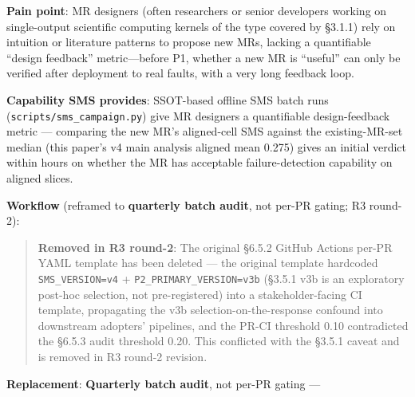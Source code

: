 \documentclass[review,12pt,authoryear]{elsarticle}
\begin{document}
\textbf{Pain point}: MR designers (often researchers or senior
developers working on single-output scientific computing kernels of the
type covered by §3.1.1) rely on intuition or literature patterns to
propose new MRs, lacking a quantifiable ``design feedback''
metric---before P1, whether a new MR is ``useful'' can only be verified
after deployment to real faults, with a very long feedback loop.

\textbf{Capability SMS provides}: SSOT-based offline SMS batch runs
(\texttt{scripts/sms\_campaign.py}) give MR designers a quantifiable
design-feedback metric --- comparing the new MR's aligned-cell SMS
against the existing-MR-set median (this paper's v4 main analysis
aligned mean 0.275) gives an initial verdict within hours on whether the
MR has acceptable failure-detection capability on aligned slices.

\textbf{Workflow} (reframed to \textbf{quarterly batch audit}, not
per-PR gating; R3 round-2):

\begin{quote}
\textbf{Removed in R3 round-2}: The original §6.5.2 GitHub Actions
per-PR YAML template has been deleted --- the original template
hardcoded \texttt{SMS\_VERSION=v4} + \texttt{P2\_PRIMARY\_VERSION=v3b}
(§3.5.1 v3b is an exploratory post-hoc selection, not pre-registered)
into a stakeholder-facing CI template, propagating the v3b
selection-on-the-response confound into downstream adopters' pipelines,
and the PR-CI threshold 0.10 contradicted the §6.5.3 audit threshold
0.20. This conflicted with the §3.5.1 caveat and is removed in R3
round-2 revision.
\end{quote}

\textbf{Replacement}: \textbf{Quarterly batch audit}, not per-PR gating
---
\end{document}
